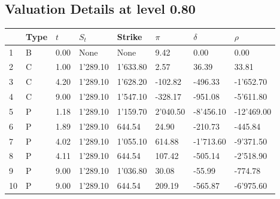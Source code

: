 \documentclass[12pt]{article}
\begin{document}
\begin{center} 
 \subsection{Valuation Details at level 0.80} 
 \par 
 \begin{scriptsize} 
 \begin{tabular}{p{13.1 mm}|p{13.1 mm}|p{13.1 mm}|p{13.1 mm}|p{13.1 mm}|p{13.1 mm}|p{13.1 mm}|p{13.1 mm}} 
          &     Type &      $t$ &    $S_t$ &   Strike &    $\pi$ & $\delta$ &   $\rho$ \\ \hline 
1 & B& 0.00& None& None& 9.42& 0.00& 0.00\\ 
2 & C& 1.00& 1'289.10& 1'633.80& 2.57& 36.39& 33.81\\ 
3 & C& 4.20& 1'289.10& 1'628.20& -102.82& -496.33& -1'652.70\\ 
4 & C& 9.00& 1'289.10& 1'547.10& -328.17& -951.08& -5'611.80\\ 
5 & P& 1.18& 1'289.10& 1'159.70& 2'040.50& -8'456.10& -12'469.00\\ 
6 & P& 1.89& 1'289.10& 644.54& 24.90& -210.73& -445.84\\ 
7 & P& 4.02& 1'289.10& 1'055.10& 614.88& -1'713.60& -9'371.50\\ 
8 & P& 4.11& 1'289.10& 644.54& 107.42& -505.14& -2'518.90\\ 
9 & P& 9.00& 1'289.10& 1'036.80& 30.08& -55.99& -774.78\\ 
10 & P& 9.00& 1'289.10& 644.54& 209.19& -565.87& -6'975.60\\ 
\end{tabular} 
  \end{scriptsize} 
 \end{center}%
\end{document}
